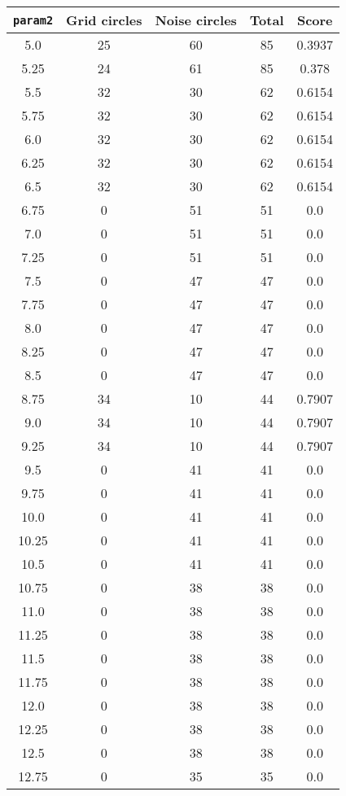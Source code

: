 \documentclass[letterpaper, 12pt]{article}
\begin{document}
\begin{longtable}{|c|c|c|c|c|}
\hline
\textbf{\texttt{param2}} & \textbf{Grid circles} & \textbf{Noise circles} & \textbf{Total} & \textbf{Score} \\
\hline
5.0 & 25 & 60 & 85 & 0.3937 \\
\hline
5.25 & 24 & 61 & 85 & 0.378 \\
\hline
5.5 & 32 & 30 & 62 & 0.6154 \\
\hline
5.75 & 32 & 30 & 62 & 0.6154 \\
\hline
6.0 & 32 & 30 & 62 & 0.6154 \\
\hline
6.25 & 32 & 30 & 62 & 0.6154 \\
\hline
6.5 & 32 & 30 & 62 & 0.6154 \\
\hline
6.75 & 0 & 51 & 51 & 0.0 \\
\hline
7.0 & 0 & 51 & 51 & 0.0 \\
\hline
7.25 & 0 & 51 & 51 & 0.0 \\
\hline
7.5 & 0 & 47 & 47 & 0.0 \\
\hline
7.75 & 0 & 47 & 47 & 0.0 \\
\hline
8.0 & 0 & 47 & 47 & 0.0 \\
\hline
8.25 & 0 & 47 & 47 & 0.0 \\
\hline
8.5 & 0 & 47 & 47 & 0.0 \\
\hline
8.75 & 34 & 10 & 44 & 0.7907 \\
\hline
9.0 & 34 & 10 & 44 & 0.7907 \\
\hline
9.25 & 34 & 10 & 44 & 0.7907 \\
\hline
9.5 & 0 & 41 & 41 & 0.0 \\
\hline
9.75 & 0 & 41 & 41 & 0.0 \\
\hline
10.0 & 0 & 41 & 41 & 0.0 \\
\hline
10.25 & 0 & 41 & 41 & 0.0 \\
\hline
10.5 & 0 & 41 & 41 & 0.0 \\
\hline
10.75 & 0 & 38 & 38 & 0.0 \\
\hline
11.0 & 0 & 38 & 38 & 0.0 \\
\hline
11.25 & 0 & 38 & 38 & 0.0 \\
\hline
11.5 & 0 & 38 & 38 & 0.0 \\
\hline
11.75 & 0 & 38 & 38 & 0.0 \\
\hline
12.0 & 0 & 38 & 38 & 0.0 \\
\hline
12.25 & 0 & 38 & 38 & 0.0 \\
\hline
12.5 & 0 & 38 & 38 & 0.0 \\
\hline
12.75 & 0 & 35 & 35 & 0.0 \\

\end{longtable}
\end{document}

